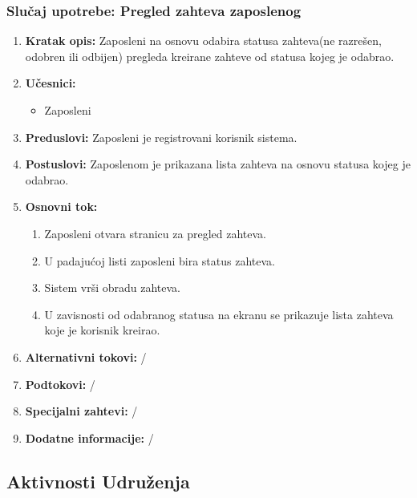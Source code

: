 \documentclass[a4paper]{article}
\begin{document}
\subsubsection{Slučaj upotrebe: Pregled zahteva zaposlenog}
\begin{enumerate}
    \item \textbf{Kratak opis:} Zaposleni na osnovu odabira statusa zahteva(ne razrešen, odobren ili odbijen) pregleda kreirane zahteve od statusa kojeg je odabrao.
    \item \textbf{Učesnici:}
        \begin{itemize}
            \item Zaposleni
        \end{itemize}
    \item \textbf{Preduslovi:} Zaposleni je registrovani korisnik sistema.
    \item \textbf{Postuslovi:} Zaposlenom je prikazana lista zahteva na osnovu statusa kojeg je odabrao.
    \item \textbf{Osnovni tok:}
        \begin{enumerate}
            \item Zaposleni otvara stranicu za pregled zahteva.
            \item U padajućoj listi zaposleni bira status zahteva.
            \item Sistem vrši obradu zahteva.
            \item U zavisnosti od odabranog statusa na ekranu se prikazuje lista zahteva koje je korisnik kreirao.
        \end{enumerate}
    \item \textbf{Alternativni tokovi:} /
    \item \textbf{Podtokovi:} /
    \item \textbf{Specijalni zahtevi:} /
    \item \textbf{Dodatne informacije:} /
\end{enumerate}

\newpage
\subsection{Aktivnosti Udruženja}
\end{document}
